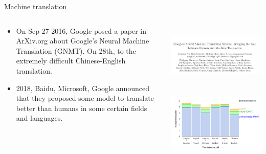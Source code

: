 \documentclass{beamer}
\begin{document}
\begin{CJK*}{UTF8}{gbsn}
\begin{frame}{Machine translation}
\begin{columns}
\begin{column}{0.6\textwidth}
\begin{itemize}
\item On Sep 27 2016,  Google posed a paper in ArXiv.org about Google's Neural Machine Translation (GNMT). On 28th, to the extremely difficult Chinese-English translation. 

\item 2018, Baidu, Microsoft, Google announced that they proposed some model to translate better than humans in some certain fields and languages.
\end{itemize}
\end{column}

\begin{column}{0.4\textwidth}
\centering  
\includegraphics[width=\textwidth]{figures/MachineTranslation1}  \\
\centering  
\includegraphics[width=\textwidth]{figures/MachineTranslation2}  
\end{column}
\end{columns}
\end{frame}



\end{CJK*}
\end{document}
